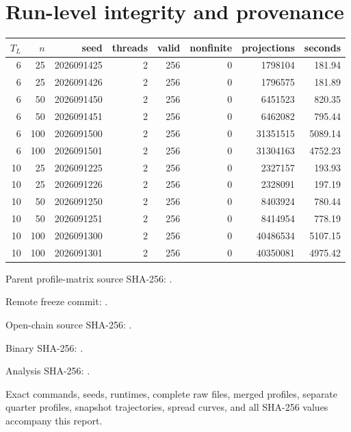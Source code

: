 \documentclass[10pt]{article}
\begin{document}
\clearpage
\section{Run-level integrity and provenance}
\scriptsize
\begin{longtable}{r r r r r r r r}
\toprule
$T_L$ & $n$ & seed & threads & valid & nonfinite & projections & seconds\\
\midrule
\endfirsthead
6 & 25 & 2026091425 & 2 & 256 & 0 & 1798104 & 181.94 \\
6 & 25 & 2026091426 & 2 & 256 & 0 & 1796575 & 181.89 \\
6 & 50 & 2026091450 & 2 & 256 & 0 & 6451523 & 820.35 \\
6 & 50 & 2026091451 & 2 & 256 & 0 & 6462082 & 795.44 \\
6 & 100 & 2026091500 & 2 & 256 & 0 & 31351515 & 5089.14 \\
6 & 100 & 2026091501 & 2 & 256 & 0 & 31304163 & 4752.23 \\
10 & 25 & 2026091225 & 2 & 256 & 0 & 2327157 & 193.93 \\
10 & 25 & 2026091226 & 2 & 256 & 0 & 2328091 & 197.19 \\
10 & 50 & 2026091250 & 2 & 256 & 0 & 8403924 & 780.44 \\
10 & 50 & 2026091251 & 2 & 256 & 0 & 8414954 & 778.19 \\
10 & 100 & 2026091300 & 2 & 256 & 0 & 40486534 & 5107.15 \\
10 & 100 & 2026091301 & 2 & 256 & 0 & 40350081 & 4975.42 \\
\bottomrule
\end{longtable}
\normalsize

Parent profile-matrix source SHA-256:
.

Remote freeze commit:
.

Open-chain source SHA-256:
.

Binary SHA-256:
.

Analysis SHA-256:
.

Exact commands, seeds, runtimes, complete raw files, merged profiles, separate
quarter profiles, snapshot trajectories, spread curves, and all SHA-256 values
accompany this report.
\end{document}
